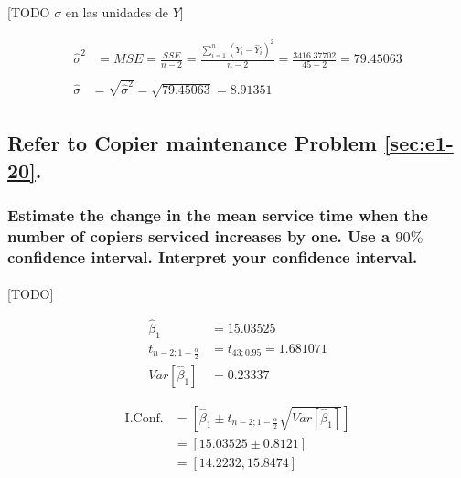 \documentclass{article}
\begin{document}
        \paragraph{}
        [TODO $\sigma$ en las unidades de $Y$]

        \begin{align}
          \begin{split}
            \widehat{\sigma}^2 &= MSE = \frac{SSE}{n-2} = \frac{\sum_{i=1}^n(Y_i - \widehat{Y}_i)^2}{n-2} = \frac{3416.37702}{45-2} = 79.45063
          \end{split} \\
          \begin{split}
            \widehat{\sigma} &= \sqrt{\widehat{\sigma}^2} = \sqrt{79.45063} = 8.91351
          \end{split}
        \end{align}

    \setcounter{section}{2}
    \setcounter{subsection}{4}
    \subsection{Refer to \textbf{Copier maintenance} Problem \ref{sec:e1-20}.}
    \label{sec:copiers-2.5}

      \subsubsection{Estimate the change in the mean service time when the number of copiers serviced increases by one. Use a $90\%$ confidence interval. Interpret your confidence interval.}
      \label{sec:copiers-2.5a}

        \paragraph{}
        [TODO]

        \begin{align}
          \widehat{\beta}_1 &= 15.03525 \\
          t_{n-2;1-\frac{\alpha}{2}} &= t_{43;0.95} = 1.681071\\
          Var\left[\widehat{\beta}_1\right] &= 0.23337
        \end{align}

        \begin{equation}
          \begin{split}
            \text{I.Conf.} &= \left[\widehat{\beta}_1 \pm t_{n-2;1-\frac{\alpha}{2}}\sqrt{Var\left[\widehat{\beta}_1\right]}\right]\\
            &= \left[15.03525 \pm 0.8121\right] \\
            &= \left[14.2232, 15.8474\right]
          \end{split}
        \end{equation}
\end{document}
